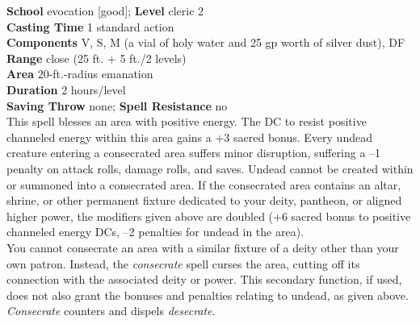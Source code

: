 \textbf{School} evocation [good]; \textbf{Level} cleric 2\\
\textbf{Casting Time} 1 standard action\\
\textbf{Components} V, S, M (a vial of holy water and 25 gp worth of silver dust), DF\\
\textbf{Range} close (25 ft. + 5 ft./2 levels)\\
\textbf{Area} 20-ft.-radius emanation\\
\textbf{Duration} 2 hours/level\\
\textbf{Saving Throw} none; \textbf{Spell Resistance} no\\
This spell blesses an area with positive energy. The DC to resist positive channeled energy within this area gains a +3 sacred bonus. Every undead creature entering a consecrated area suffers minor disruption, suffering a --1 penalty on attack rolls, damage rolls, and saves. Undead cannot be created within or summoned into a consecrated area. If the consecrated area contains an altar, shrine, or other permanent fixture dedicated to your deity, pantheon, or aligned higher power, the modifiers given above are doubled (+6 sacred bonus to positive channeled energy DCs, --2 penalties for undead in the area).\\
You cannot consecrate an area with a similar fixture of a deity other than your own patron. Instead, the \textit{consecrate }spell curses the area, cutting off its connection with the associated deity or power. This secondary function, if used, does not also grant the bonuses and penalties relating to undead, as given above.\\
\textit{Consecrate }counters and dispels \textit{desecrate}.\\

